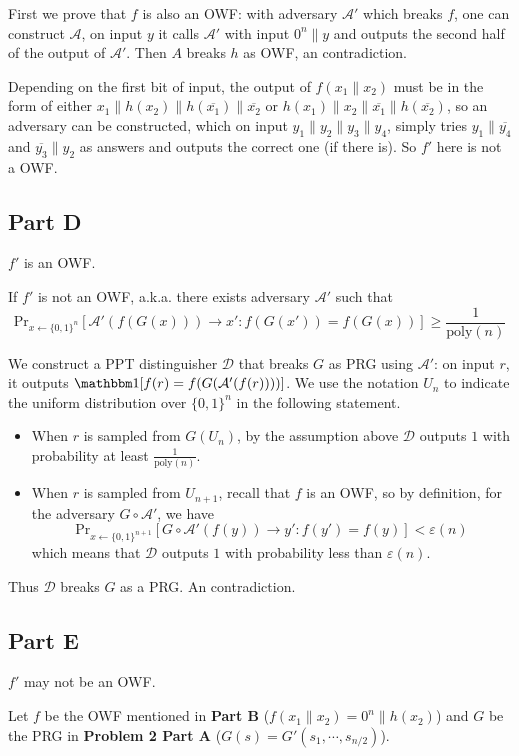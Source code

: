 \documentclass[8pt]{article}
\theoremstyle{compact}
\def\ge{\geqslant}
\begin{document}
First we prove that $f$ is also an OWF: with adversary $\mathcal A'$ which breaks $f$, one can construct $\mathcal A$, on input $y$ it calls $\mathcal A'$ with input $0^n\|y$ and outputs the second half of the output of $\mathcal A'$. Then $A$ breaks $h$ as OWF, an contradiction.

Depending on the first bit of input, the output of $f(x_1 \| x_2)$ must be in the form of either $x_1 \| h(x_2) \| h(\overline{x_1}) \| \overline{x_2}$ or $h(x_1) \| x_2 \| \overline{x_1} \| h(\overline{x_2})$, so an adversary can be constructed, which on input $y_1 \| y_2 \| y_3 \| y_4$, simply tries $y_1 \| \overline{y_4}$ and $\overline{y_3} \| y_2$ as answers and outputs the correct one (if there is). So $f'$ here is not a OWF.
\subsection*{Part D}
$f'$ is an OWF.

If $f'$ is not an OWF, a.k.a. there exists adversary $\mathcal A'$ such that $$\text{Pr}_{x \gets \{0, 1\}^n} [\mathcal A'(f(G(x))) \to x': f(G(x')) = f(G(x))] \ge \frac{1}{\text{poly}(n)}$$

We construct a PPT distinguisher $\mathcal D$ that breaks $G$ as PRG using $\mathcal A'$: on input $r$, it outputs $\mathbbm 1[f(r) = f(G(\mathcal A'(f(r))))]$. We use the notation $U_n$ to indicate the uniform distribution over $\{0, 1\}^n$ in the following statement.

\begin{itemize}
	\item When $r$ is sampled from $G(U_n)$, by the assumption above $\mathcal D$ outputs $1$ with probability at least $\frac{1}{\text{poly}(n)}$.
	\item When $r$ is sampled from $U_{n+1}$, recall that $f$ is an OWF, so by definition, for the adversary $G \circ \mathcal A'$, we have $$\text{Pr}_{x \gets \{0, 1\}^{n+1}}[G \circ \mathcal A'(f(y)) \to y': f(y') = f(y)] < \varepsilon(n)$$ which means that $\mathcal D$ outputs $1$ with probability less than $\varepsilon(n)$.
\end{itemize}

Thus $\mathcal D$ breaks $G$ as a PRG. An contradiction.
\subsection*{Part E}
$f'$ may not be an OWF.

Let $f$ be the OWF mentioned in \textbf{Part B} ($f(x_1 \| x_2) = 0^n \| h(x_2)$) and $G$ be the PRG in \textbf{Problem 2 Part A} ($G(s) = G'(s_1, \cdots, s_{n/2})$).
\end{document}
